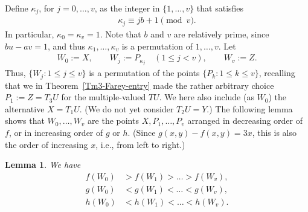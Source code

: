 \documentclass[11pt,reqno,tbtags,a4paper]{amsart}
\numberwithin{equation}{section}
\renewcommand\le{\leq}
\renewcommand\leq{\leqslant}
\theoremstyle{plain}%
\newtheorem{lemma}[theorem]{Lemma}
\theoremstyle{definition}
\theoremstyle{remark}
\newcommand{\refT}[1]{Theorem~\ref{#1}}
\newcommand\set[1]{\ensuremath{\{#1\}}}
\newcommand\kk{\kappa}
\newcommand\0{{\boldsymbol 0}}
\newcommand\1{{\boldsymbol 1}}
\begin{document}
Define $\kk_j$, for $j=0,\dots,v$, as the integer in $\set{1,\dots,v}$
that satisfies
\begin{align}  \label{qa1}
\kk_j\equiv jb+1\pmod v.
\end{align}
In particular, $\kk_0=\kk_v=1$.
Note that $b$ and $v$ are relatively prime, since $bu-av=1$, 
and thus $\kk_1,\dots,\kk_v$ is a permutation of $1,\dots,v$.
Let
\begin{align}\label{qa2}
 W_0:=X,\qquad W_j:=P_{\kappa_j}\quad(1\le j<v),\qquad W_v:=Z.
\end{align}
Thus, $\set{W_j:1\le j\le v}$ is a permutation of the points 
$\set{P_k:1\le k\le v}$, recalling that we
in \refT{Tm3-Farey-entry} made the rather arbitrary choice
$P_1:=Z=T_3U$ for the multiple-valued $TU$. 
We here also include (as $W_0$) the alternative $X=T_1U$.
(We do not yet consider $T_2U=Y$.)
The following lemma shows that $W_0,\dots,W_v$ are the points
$X,P_1,\dots,P_v$ arranged in decreasing order of $f$, or in increasing
order of $g$ or $h$.
(Since $g(x,y)-f(x,y)=3x$, this is also the order of increasing $x$, i.e.,
from left to right.)
\begin{lemma}\label{Lm3-shadowing}
We have %
\begin{align}%
 f(W_0)&>f(W_1)>\dots>f(W_v),\label{qa3f}
\\
 g(W_0)&<g(W_1)<\dots<g(W_v),\label{qa3g}
\\
 h(W_0)&<h(W_1)<\dots<h(W_v).\label{qa3h}
\end{align}
\end{lemma}
\end{document}
